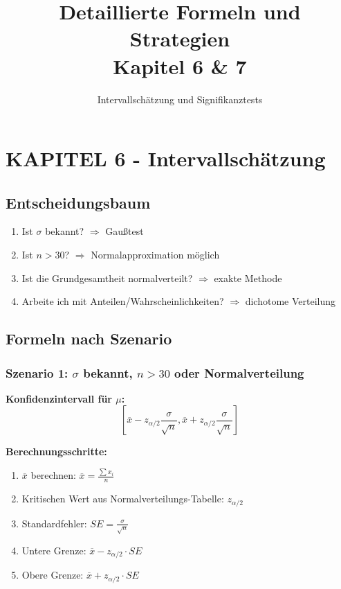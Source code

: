 \documentclass[12pt, a4paper, ngerman]{scrartcl}
\title{Detaillierte Formeln und Strategien\\Kapitel 6 \& 7}
\subtitle{Intervallschätzung und Signifikanztests}
\author{}
\date{}
\begin{document}
\maketitle

\section{KAPITEL 6 - Intervallschätzung}

\subsection{Entscheidungsbaum}

\begin{enumerate}
  \item Ist $\sigma$ bekannt? $\Rightarrow$ Gaußtest
  \item Ist $n > 30$? $\Rightarrow$ Normalapproximation möglich
  \item Ist die Grundgesamtheit normalverteilt? $\Rightarrow$ exakte Methode
  \item Arbeite ich mit Anteilen/Wahrscheinlichkeiten? $\Rightarrow$ dichotome Verteilung
\end{enumerate}

\subsection{Formeln nach Szenario}

\subsubsection{Szenario 1: $\sigma$ bekannt, $n > 30$ oder Normalverteilung}

\textbf{Konfidenzintervall für $\mu$:}
$$\left[\overline{x} - z_{\alpha/2} \frac{\sigma}{\sqrt{n}}, \overline{x} + z_{\alpha/2} \frac{\sigma}{\sqrt{n}}\right]$$

\textbf{Berechnungsschritte:}
\begin{enumerate}
  \item $\overline{x}$ berechnen: $\overline{x} = \frac{\sum x_i}{n}$
  \item Kritischen Wert aus Normalverteilungs-Tabelle: $z_{\alpha/2}$
  \item Standardfehler: $SE = \frac{\sigma}{\sqrt{n}}$
  \item Untere Grenze: $\overline{x} - z_{\alpha/2} \cdot SE$
  \item Obere Grenze: $\overline{x} + z_{\alpha/2} \cdot SE$
\end{enumerate}
\end{document}
